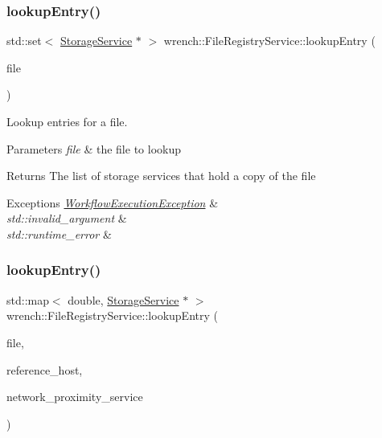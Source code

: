 \subsubsection{\texorpdfstring{lookup\+Entry()}{lookupEntry()}\hspace{0.1cm}{\footnotesize\ttfamily [1/2]}}
{\footnotesize\ttfamily std\+::set$<$ \hyperlink{classwrench_1_1_storage_service}{Storage\+Service} $\ast$ $>$ wrench\+::\+File\+Registry\+Service\+::lookup\+Entry (\begin{DoxyParamCaption}\item[{\hyperlink{classwrench_1_1_workflow_file}{Workflow\+File} $\ast$}]{file }\end{DoxyParamCaption})}



Lookup entries for a file. 


\begin{DoxyParams}{Parameters}
{\em file} & the file to lookup \\
\hline
\end{DoxyParams}
\begin{DoxyReturn}{Returns}
The list of storage services that hold a copy of the file
\end{DoxyReturn}

\begin{DoxyExceptions}{Exceptions}
{\em \hyperlink{classwrench_1_1_workflow_execution_exception}{Workflow\+Execution\+Exception}} & \\
\hline
{\em std\+::invalid\+\_\+argument} & \\
\hline
{\em std\+::runtime\+\_\+error} & \\
\hline
\end{DoxyExceptions}
\mbox{\label{classwrench_1_1_file_registry_service_a729671ba5d3f3d0da7f3e15058515aa7}} 
\subsubsection{\texorpdfstring{lookup\+Entry()}{lookupEntry()}\hspace{0.1cm}{\footnotesize\ttfamily [2/2]}}
{\footnotesize\ttfamily std\+::map$<$ double, \hyperlink{classwrench_1_1_storage_service}{Storage\+Service} $\ast$ $>$ wrench\+::\+File\+Registry\+Service\+::lookup\+Entry (\begin{DoxyParamCaption}\item[{\hyperlink{classwrench_1_1_workflow_file}{Workflow\+File} $\ast$}]{file,  }\item[{std\+::string}]{reference\+\_\+host,  }\item[{\hyperlink{classwrench_1_1_network_proximity_service}{Network\+Proximity\+Service} $\ast$}]{network\+\_\+proximity\+\_\+service }\end{DoxyParamCaption})}



